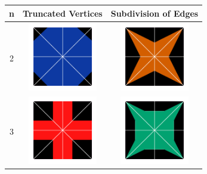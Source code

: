 \documentclass{beamer}
\begin{document}
\begin{frame}
\begin{table}
\centering
\begin{tabular}{c|c|c}
n & Truncated Vertices & Subdivision of Edges\\\hline
2 &\includegraphics[width=3cm]{img/claire/8tv}&\includegraphics[width=3cm]{img/claire/8se} \\\hline
3 & \includegraphics[width=3cm]{img/claire/12tv} &\includegraphics[width=3cm]{img/claire/12se}\\\hline
\end{tabular}
\end{table}
\end{frame}
\end{document}

